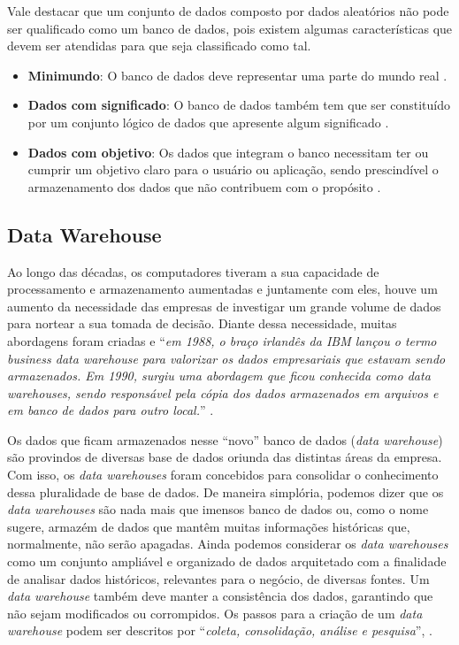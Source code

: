 Vale destacar que um conjunto de dados composto por dados aleatórios não pode ser qualificado como um banco de dados, pois existem algumas características que devem ser atendidas para que seja classificado como tal.

\begin{itemize}
  \item \textbf{Minimundo}: O banco de dados deve representar uma parte do mundo real \cite{vida2021datawarehouse}.
  \item \textbf{Dados com significado}: O banco de dados também tem que ser constituído por um conjunto lógico de dados que apresente algum significado \cite{vida2021datawarehouse}.
  \item \textbf{Dados com objetivo}: Os dados que integram o banco necessitam ter ou cumprir um objetivo claro para o usuário ou aplicação, sendo prescindível o armazenamento dos dados que não contribuem com o propósito \cite{vida2021datawarehouse}.
\end{itemize} 


\subsection{Data Warehouse}
\label{subsec:datawarehouse}

Ao longo das décadas, os computadores tiveram a sua capacidade de processamento e armazenamento aumentadas e juntamente com eles, houve um aumento da necessidade das empresas de investigar um grande volume de dados para nortear a sua tomada de decisão. Diante dessa necessidade, muitas abordagens foram criadas e \enquote{\textit{em 1988, o braço irlandês da IBM lançou o termo business data warehouse para valorizar os dados empresariais que estavam sendo armazenados. Em 1990, surgiu uma abordagem que ficou conhecida como data warehouses, sendo responsável pela cópia dos dados armazenados em arquivos e em banco de dados para outro local.}} \cite{vida2021datawarehouse}.

Os dados que ficam armazenados nesse \enquote{novo} banco de dados (\textit{data warehouse}) são provindos de diversas base de dados oriunda das distintas áreas da empresa. Com isso, os \textit{data warehouses} foram concebidos para consolidar o conhecimento dessa pluralidade de base de dados. De maneira simplória, podemos dizer que os \textit{data warehouses} são nada mais que imensos banco de dados ou, como o nome sugere, armazém de dados que mantêm muitas informações históricas que, normalmente, não serão apagadas. Ainda podemos considerar os \textit{data warehouses} como um conjunto ampliável e organizado de dados arquitetado com a finalidade de analisar dados históricos, relevantes para o negócio, de diversas fontes. Um \textit{data warehouse} também deve manter a consistência dos dados, garantindo que não sejam modificados ou corrompidos. Os passos para a criação de um \textit{data warehouse} podem ser descritos por \enquote{\textit{coleta, consolidação, análise e pesquisa}}, \cite{vida2021datawarehouse}.


